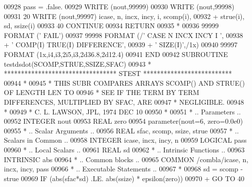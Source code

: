 \begin{DoxyCode}
00928          pass = .false.
00929          \textcolor{keyword}{WRITE} (nout,99999)
00930          \textcolor{keyword}{WRITE} (nout,99998)
00931    20    \textcolor{keyword}{WRITE} (nout,99997) icase, n, incx, incy, i, scomp(i),
00932      +     strue(i), sd, ssize(i)
00933    40 \textcolor{keywordflow}{CONTINUE}
00934       \textcolor{keywordflow}{RETURN}
00935 \textcolor{comment}{*}
00936 99999 \textcolor{keyword}{FORMAT} (\textcolor{stringliteral}{'                                       FAIL'})
00937 99998 \textcolor{keyword}{FORMAT} (/\textcolor{stringliteral}{' CASE  N INCX INCY  I                            '},
00938      +       \textcolor{stringliteral}{' COMP(I)                             TRUE(I)  DIFFERENCE'},
00939      +       \textcolor{stringliteral}{'     SIZE(I)'},/1x)
00940 99997 \textcolor{keyword}{FORMAT} (1x,i4,i3,2i5,i3,2d36.8,2d12.4)
00941 \textcolor{keyword}{      END}
00942 \textcolor{keyword}{      SUBROUTINE }testdsdot(SCOMP,STRUE,SSIZE,SFAC)
00943 \textcolor{comment}{*     ********************************* STEST **************************}
00944 \textcolor{comment}{*}
00945 \textcolor{comment}{*     THIS SUBR COMPARES ARRAYS  SCOMP() AND STRUE() OF LENGTH LEN TO}
00946 \textcolor{comment}{*     SEE IF THE TERM BY TERM DIFFERENCES, MULTIPLIED BY SFAC, ARE}
00947 \textcolor{comment}{*     NEGLIGIBLE.}
00948 \textcolor{comment}{*}
00949 \textcolor{comment}{*     C. L. LAWSON, JPL, 1974 DEC 10}
00950 \textcolor{comment}{*}
00951 \textcolor{comment}{*     .. Parameters ..}
00952       \textcolor{keywordtype}{INTEGER}          nout
00953       \textcolor{keywordtype}{REAL}             zero
00954       parameter(nout=6, zero=0.0e0)
00955 \textcolor{comment}{*     .. Scalar Arguments ..}
00956       \textcolor{keywordtype}{REAL}             sfac, scomp, ssize, strue
00957 \textcolor{comment}{*     .. Scalars in Common ..}
00958       \textcolor{keywordtype}{INTEGER}          icase, incx, incy, n
00959       \textcolor{keywordtype}{LOGICAL}          pass
00960 \textcolor{comment}{*     .. Local Scalars ..}
00961       \textcolor{keywordtype}{REAL}             sd
00962 \textcolor{comment}{*     .. Intrinsic Functions ..}
00963       \textcolor{keywordtype}{INTRINSIC}        abs
00964 \textcolor{comment}{*     .. Common blocks ..}
00965       \textcolor{keyword}{COMMON}           /combla/icase, n, incx, incy, pass
00966 \textcolor{comment}{*     .. Executable Statements ..}
00967 \textcolor{comment}{*}
00968          sd = scomp - strue
00969          \textcolor{keywordflow}{IF} (abs(sfac*sd) .LE. abs(ssize) * epsilon(zero))
00970      +       \textcolor{keywordflow}{GO TO} 40

\end{DoxyCode}
